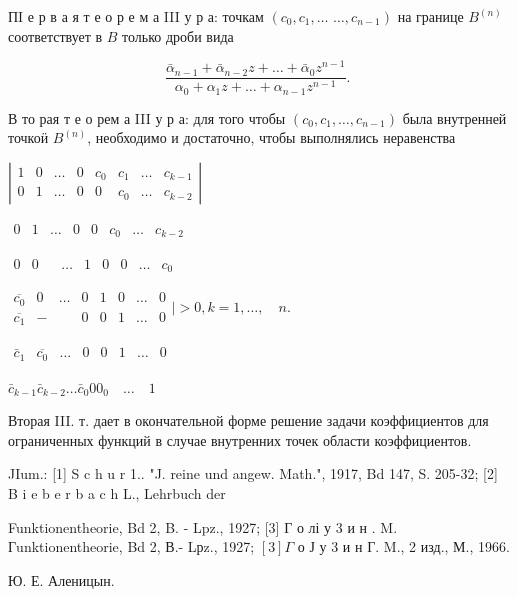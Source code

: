\documentclass[10pt]{article}
\begin{document}
ПI е р в а я т е о р е м а III у р а: точкам $\left(c_{0}, c_{1}, \ldots\right.$ $\left.\ldots, c_{n-1}\right)$ на границе $B^{(n)}$ соответствует в $B$ только дроби вида



\[

\frac{\bar{\alpha}_{n-1}+\bar{\alpha}_{n-2} z+\ldots+\bar{\alpha}_{0} z^{n-1}}{\alpha_{0}+\alpha_{1} z+\ldots+\alpha_{n-1} z^{n-1}} \text {. }

\]



В то рая т е о рем а III у р а: для того чтобы $\left(c_{0}, c_{1}, \ldots, c_{n-1}\right)$ была внутренней точкоӥ $B^{(n)}$, необходимо и достаточно, чтобы выполнялись неравенства



$\left|\begin{array}{llllllll}1 & 0 & \ldots & 0 & c_{0} & c_{1} & \ldots & c_{k-1} \\ 0 & 1 & \ldots & 0 & 0 & c_{0} & \ldots & c_{k-2}\end{array}\right|$



$\begin{array}{llllllll}0 & 1 & \ldots & 0 & 0 & c_{0} & \ldots & c_{k-2}\end{array}$



$\begin{array}{llllllllll}0 & 0 & & \ldots & 1 & 0 & 0 & \ldots & c_{0}\end{array}$



$\begin{array}{llllllll}\overline{c_{0}} & 0 & \ldots & 0 & 1 & 0 & \ldots & 0 \\ \overline{c_{1}} & - & & 0 & 0 & 1 & \ldots & 0\end{array} \mid>0, k=1, \ldots, \quad n$.



$\begin{array}{llllllll}\bar{c}_{1} & \overline{c_{0}} & \ldots & 0 & 0 & 1 & \ldots & 0\end{array}$



$\bar{c}_{k-1} \bar{c}_{k-2} \ldots \bar{c}_{0} 00_{0} \quad \ldots \quad 1$



Вторая III. т. дает в окончательной форме решение задачи коэффициентов для ограниченных функций в случае внутренних точек области коэффициентов.



JIum.: [1] S c h u r 1.. "J. reine und angew. Math.", 1917, Bd 147, S. 205-32; [2] B i e b e r b a c h L., Lehrbuch der

Funktionentheorie, Bd 2, B. - Lpz., 1927; [3] Г о лі у 3 и н . M. Гunktionentheorie, Bd 2, В.- Lрz., 1927; $[3] \Gamma$ о Ј у 3 и н Г. M., 2 изд., М., 1966.



Ю. Е. Аленицын.
\end{document}
